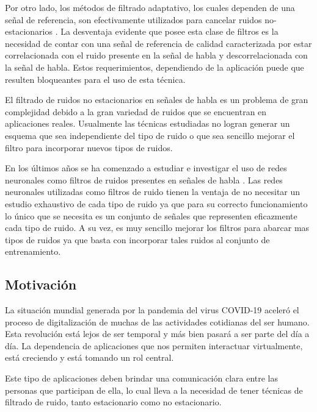 Por otro lado, los métodos de filtrado adaptativo, los cuales dependen de una señal de referencia, son efectivamente utilizados para cancelar ruidos no-estacionarios \cite{a_family_of_adaptive_filter_slgorithms_in_noise_cancellation_for_speech_enhancement}. La desventaja evidente que posee esta clase de filtros es la necesidad de contar con una señal de referencia de calidad caracterizada por estar correlacionada con el ruido presente en la señal de habla y descorrelacionada con la señal de habla. Estos requerimientos, dependiendo de la aplicación puede que resulten bloqueantes para el uso de esta técnica.

El filtrado de ruidos no estacionarios en señales de habla es un problema de gran complejidad debido a la gran variedad de ruidos que se encuentran en aplicaciones reales. Usualmente las técnicas estudiadas no logran generar un esquema que sea independiente del tipo de ruido o que sea sencillo mejorar el filtro para incorporar nuevos tipos de ruidos.

En los últimos años se ha comenzado a estudiar e investigar el uso de redes neuronales como filtros de ruidos presentes en señales de habla \cite{a_regression_approach_to_speech_enhancement_based_on_deep_neural_networks,speech_enhancement_in_multiple_moise_conditions_using_deep_neural_networks,a_convolutional_recurrent_neural_network_for_real_time_speech_enhancement}. Las redes neuronales utilizadas como filtros de ruido tienen la ventaja de no necesitar un estudio exhaustivo de cada tipo de ruido ya que para su correcto funcionamiento lo único que se necesita es un conjunto de señales que representen eficazmente cada tipo de ruido. A su vez, es muy sencillo mejorar los filtros para abarcar mas tipos de ruidos ya que basta con incorporar tales ruidos al conjunto de entrenamiento.

\subsection{Motivación}

La situación mundial generada por la pandemia del virus COVID-19 aceleró el proceso de digitalización de muchas de las actividades cotidianas del ser humano. Esta revolución está lejos de ser temporal y más bien pasará a ser parte del día a día. La dependencia de aplicaciones que nos permiten interactuar virtualmente, está creciendo y está tomando un rol central.

Este tipo de aplicaciones deben brindar una comunicación clara entre las personas que participan de ella, lo cual lleva a la necesidad de tener técnicas de filtrado de ruido, tanto estacionario como no estacionario.

